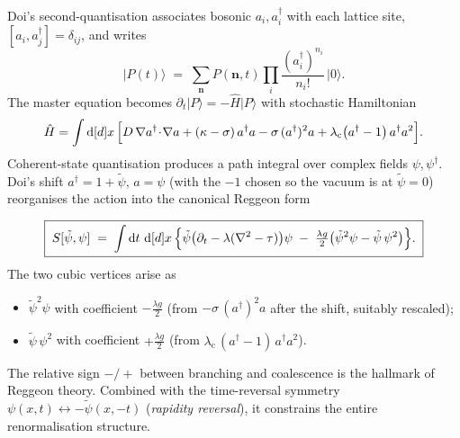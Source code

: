 \documentclass[11pt,a4paper]{article}
\renewcommand{\dd}[1]{\,\mathrm{d}#1}
\theoremstyle{definition}
\theoremstyle{plain}
\begin{document}
\begin{stdbox}
Doi's second-quantisation associates bosonic
$a_i, a_i^\dagger$ with each lattice site, $[a_i, a_j^\dagger] =
\delta_{ij}$, and writes
\begin{equation}\label{eq:fock-state-app}
  \lvert P(t)\rangle \;=\; \sum_\mathbf n P(\mathbf n,t)
    \prod_i \frac{(a_i^\dagger)^{n_i}}{n_i!}\,\lvert 0\rangle.
\end{equation}
The master equation becomes $\partial_t \lvert P\rangle = -\hat H
\lvert P\rangle$ with stochastic Hamiltonian
\begin{equation}\label{eq:H-doi-app}
  \hat H = \int\!\dd[d]{x}\,\Bigl[
    D\,\nabla a^\dagger\!\cdot\!\nabla a
    + (\kappa - \sigma)\,a^\dagger a
    - \sigma\,(a^\dagger)^2 a
    + \lambda_{\text{c}}\bigl(a^\dagger - 1\bigr)\,a^\dagger a^2
  \Bigr].
\end{equation}
Coherent-state quantisation \cite{Peliti1985} produces a path integral
over complex fields $\psi, \psi^\dagger$.  Doi's shift
$a^\dagger = 1 + \tilde\psi$, $a = \psi$ (with the $-1$ chosen so the
vacuum is at $\tilde\psi = 0$) reorganises the action into the
canonical Reggeon form
\end{stdbox}

\begin{cfacbox}
\begin{equation}\label{eq:reggeon-action-app}
  \boxed{\;
  S[\tilde\psi, \psi]
  \;=\; \int\!\dd t\,\dd[d]{x}\,\Bigl\{
    \tilde\psi\bigl(\partial_t - \lambda(\nabla^2 - \tau)\bigr)\psi
    \;-\;
    \tfrac{\lambda g}{2}\bigl(\tilde\psi^2 \psi - \tilde\psi\,\psi^2\bigr)
    \Bigr\}.
  \;}
\end{equation}
The two cubic vertices arise as
\begin{itemize}[leftmargin=2em]
  \item $\tilde\psi^2 \psi$ with coefficient $-\tfrac{\lambda g}{2}$
    (from $-\sigma\,(a^\dagger)^2 a$ after the shift, suitably rescaled);
  \item $\tilde\psi\,\psi^2$ with coefficient $+\tfrac{\lambda g}{2}$
    (from $\lambda_{\text{c}}\,(a^\dagger - 1)\,a^\dagger a^2$).
\end{itemize}
The relative sign $-/+$ between branching and coalescence is the
hallmark of Reggeon theory.  Combined with the time-reversal symmetry
$\psi(x,t) \leftrightarrow -\tilde\psi(x,-t)$ (\emph{rapidity
reversal}), it constrains the entire renormalisation structure.
\end{cfacbox}
\end{document}
